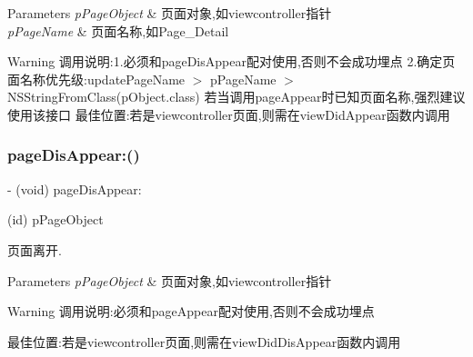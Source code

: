 \begin{DoxyParams}{Parameters}
{\em p\+Page\+Object} & 页面对象,如viewcontroller指针 \\
\hline
{\em p\+Page\+Name} & 页面名称,如\+Page\+\_\+\+Detail\\
\hline
\end{DoxyParams}
\begin{DoxyWarning}{Warning}
调用说明\+:1.必须和page\+Dis\+Appear配对使用,否则不会成功埋点 2.确定页面名称优先级\+:update\+Page\+Name $>$ p\+Page\+Name $>$ N\+S\+String\+From\+Class(p\+Object.\+class) 若当调用page\+Appear时已知页面名称,强烈建议使用该接口 最佳位置\+:若是viewcontroller页面,则需在view\+Did\+Appear函数内调用 
\end{DoxyWarning}
\mbox{\label{interface_u_t_tracker_a8d068ed1e1468a5d204f8db9033e1a0e}} 
\subsubsection{\texorpdfstring{page\+Dis\+Appear\+:()}{pageDisAppear:()}}
{\footnotesize\ttfamily -\/ (void) page\+Dis\+Appear\+: \begin{DoxyParamCaption}\item[{(id)}]{p\+Page\+Object }\end{DoxyParamCaption}}



页面离开. 


\begin{DoxyParams}{Parameters}
{\em p\+Page\+Object} & 页面对象,如viewcontroller指针\\
\hline
\end{DoxyParams}
\begin{DoxyWarning}{Warning}
调用说明\+:必须和page\+Appear配对使用,否则不会成功埋点 \begin{DoxyVerb}                     最佳位置:若是viewcontroller页面,则需在viewDidDisAppear函数内调用\end{DoxyVerb}
 
\end{DoxyWarning}
\mbox{\label{interface_u_t_tracker_ac9d1cca8b1fc2579aa0ad00c312f4188}} 
